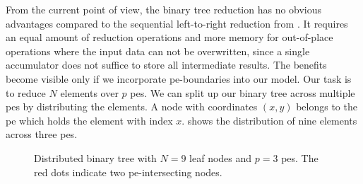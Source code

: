 From the current point of view, the binary tree reduction has no obvious advantages compared to the sequential left-to-right reduction from .
It requires an equal amount of reduction operations and more memory for out-of-place operations where the input data can not be overwritten, since a single accumulator does not suffice to store all intermediate results.
The benefits become visible only if we incorporate \gls{pe}-boundaries into our model.
Our task is to reduce $N$ elements over $p$ \glspl{pe}.
We can split up our binary tree across multiple \glspl{pe} by distributing the elements.
A node with coordinates $(x,y)$ belongs to the \gls{pe} which holds the element with index $x$.
 shows the distribution of nine elements across three \glspl{pe}.

\begin{figure}[H]
\centering
{}
    \caption{Distributed binary tree with $N=9$ leaf nodes and $p=3$ \glspl{pe}. The red dots indicate two \gls{pe}-intersecting nodes.}
\label{fig:distributed_binary_tree}
\end{figure}


